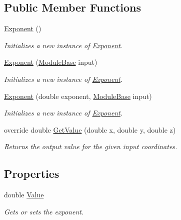 \subsection*{Public Member Functions}
\begin{DoxyCompactItemize}
\item 
\hyperlink{class_lib_noise_1_1_operator_1_1_exponent_ae7d1729cfe5163cf53d19e86c46a870e}{Exponent} ()
\begin{DoxyCompactList}\small\item\em Initializes a new instance of \hyperlink{class_lib_noise_1_1_operator_1_1_exponent}{Exponent}. \end{DoxyCompactList}\item 
\hyperlink{class_lib_noise_1_1_operator_1_1_exponent_acb51ec00cd5faaba078f051db36c5f1a}{Exponent} (\hyperlink{class_lib_noise_1_1_module_base}{Module\+Base} input)
\begin{DoxyCompactList}\small\item\em Initializes a new instance of \hyperlink{class_lib_noise_1_1_operator_1_1_exponent}{Exponent}. \end{DoxyCompactList}\item 
\hyperlink{class_lib_noise_1_1_operator_1_1_exponent_aed94176bff55b17e1cc22a536ee83a78}{Exponent} (double exponent, \hyperlink{class_lib_noise_1_1_module_base}{Module\+Base} input)
\begin{DoxyCompactList}\small\item\em Initializes a new instance of \hyperlink{class_lib_noise_1_1_operator_1_1_exponent}{Exponent}. \end{DoxyCompactList}\item 
override double \hyperlink{class_lib_noise_1_1_operator_1_1_exponent_aa7f60dbc0968a4a612cddb0806483814}{Get\+Value} (double x, double y, double z)
\begin{DoxyCompactList}\small\item\em Returns the output value for the given input coordinates. \end{DoxyCompactList}\end{DoxyCompactItemize}
\subsection*{Properties}
\begin{DoxyCompactItemize}
\item 
double \hyperlink{class_lib_noise_1_1_operator_1_1_exponent_a4e3003b342611c1566fffd7b128f5255}{Value}
\begin{DoxyCompactList}\small\item\em Gets or sets the exponent. \end{DoxyCompactList}\end{DoxyCompactItemize}
